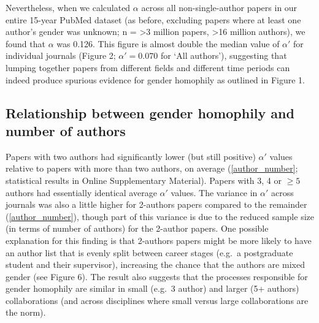 \documentclass[12pt,]{article}
\begin{document}
Nevertheless, when we calculated \(\alpha\) across all non-single-author
papers in our entire 15-year PubMed dataset (as before, excluding papers
where at least one author's gender was unknown; n = \textgreater{}3
million papers, \textgreater{}16 million authors), we found that
\(\alpha\) was 0.126. This figure is almost double the median value of
\(\alpha'\) for individual journals (Figure 2; \(\alpha' = 0.070\) for
`All authors'), suggesting that lumping together papers from different
fields and different time periods can indeed produce spurious evidence
for gender homophily as outlined in Figure 1.

\subsection{Relationship between gender homophily and number of
authors}\label{relationship-between-gender-homophily-and-number-of-authors}

Papers with two authors had significantly lower (but still positive)
\(\alpha'\) values relative to papers with more than two authors, on
average (\autoref{author_number}; statistical results in Online
Supplementary Material). Papers with 3, 4 or \(\ge5\) authors had
essentially identical average \(\alpha'\) values. The variance in
\(\alpha'\) across journals was also a little higher for 2-authors
papers compared to the remainder (\autoref{author_number}), though part
of this variance is due to the reduced sample size (in terms of number
of authors) for the 2-author papers. One possible explanation for this
finding is that 2-authors papers might be more likely to have an author
list that is evenly split between career stages (e.g.~a postgraduate
student and their supervisor), increasing the chance that the authors
are mixed gender (see Figure 6). The result also suggests that the
processes responsible for gender homophily are similar in small (e.g.~3
author) and larger (5+ authors) collaborations (and across disciplines
where small versus large collaborations are the norm).
\end{document}
